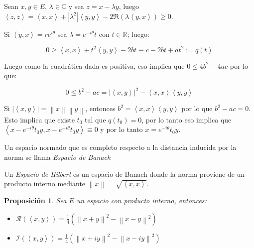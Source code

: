 \documentclass[11pt]{article}
\newcommand{\C}{\mathbb{C}}
\newcommand{\R}{{\mathbb{R}}}
\newcommand{\norm}[1]{\left\lVert#1\right\rVert}
\newcommand{\abs}[1]{\left\lvert#1\right\rvert}
\newcommand{\ip}[1]{\left\langle#1\right\rangle}
\numberwithin{theorem}{subsection}
\newtheorem{proposition}[theorem]{Proposici\'on}
\newenvironment{proof}[1][Demostraci\'on]{\begin{trivlist}
		\item[\hskip \labelsep {\bfseries #1}]}{\end{trivlist}}
\newenvironment{definition}[1][Definici\'on]{\begin{trivlist}
		\item[\hskip \labelsep {\bfseries #1}]}{\end{trivlist}}
\newcommand{\qed}{\nobreak \ifvmode \relax \else
	\ifdim\lastskip<1.5em \hskip-\lastskip
	\hskip1.5em plus0em minus0.5em \fi \nobreak
	\vrule height0.75em width0.5em depth0.25em\fi}
\begin{document}
\begin{proof}
	Sean $x,y \in E$, $\lambda \in \C$ y sea $z = x-\lambda y$, luego $\ip{z,z} = \ip{x,x} + \abs{\lambda^2}\ip{y,y} -2 \Re(\lambda \ip{y,x}) \geq 0$.
	
	Si $\ip{y,x} = re^{i \theta}$ sea $\lambda = e^{-i \theta}t$ con $t \in \R$; luego:
	
	\[
		0 \geq \ip{x,x} + t^2 \ip{y,y} - 2bt \equiv c -2bt + at^2 := q(t)
	\]
	
	Luego como la cuadr\'atica dada es positiva, eso implica que $0 \leq 4b^2 -4ac$ por lo que:
	
	\[
		0 \leq b^2 -ac = \abs{\ip{x,y}}^2 - \ip{x,x}\ip{y,y}
	\]
	
	Si $\abs{\ip{x,y}}= \norm{x} \norm{y}$, entonces $b^2 = \ip{x,x} \ip{y,y}$ por lo que $b^2 -ac = 0$. Esto implica que existe $t_0$ tal que $q(t_0) = 0$, por lo tanto eso implica que $\ip{x-e^{-i \theta}t_0 y,x- e^{-i \theta}t_0 y} \equiv 0$ y por lo tanto $x = e^{-i \theta}t_0 y$. \qed
	
\end{proof}

\begin{definition}
	Un espacio normado que es completo respecto a la distancia inducida por la norma se llama \textit{Espacio de Banach}
\end{definition}

\begin{definition}
	Un \textit{Espacio de Hilbert} es un espacio de Banach donde la norma proviene de un producto interno mediante $\norm{x} = \sqrt{\ip{x,x}}$.
\end{definition}

\begin{proposition}
	\label{Identidad de poralizacion}
	Sea $E$ un espacio con producto interno, entonces:
	
	\begin{itemize}
		\item $\mathcal{R}(\ip{x,y}) = \frac{1}{4}\left(\norm{x+y}^2 - \norm{x-y}^2\right)$
		\item $\mathcal{I}(\ip{x,y}) = \frac{1}{4}\left(\norm{x+iy}^2 - \norm{x-iy}^2\right)$
	\end{itemize}

\end{proposition}
\end{document}
